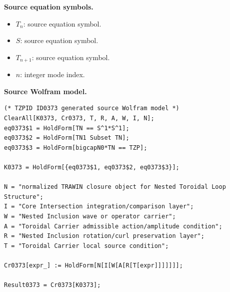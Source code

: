 \begin{minipage}[t]{0.49\linewidth}
\begingroup
\small
\raggedright
\textbf{Source equation symbols.}\par
\begin{itemize}[leftmargin=1.35em,itemsep=1pt,topsep=1pt,parsep=0pt]
    \item $T_n$: source equation symbol.
    \item $S$: source equation symbol.
    \item $T_{n+1}$: source equation symbol.
    \item $n$: integer mode index.
\end{itemize}
\endgroup
\end{minipage}\hfill
\begin{minipage}[t]{0.47\linewidth}
\begingroup
\scriptsize
\raggedright
\textbf{Source Wolfram model.}\par
\begin{Verbatim}[fontsize=\tiny,breaklines=true,breakanywhere=true]
(* TZPID ID0373 generated source Wolfram model *)
ClearAll[K0373, Cr0373, T, R, A, W, I, N];
eq0373$1 = HoldForm[TN == S^1*S^1];
eq0373$2 = HoldForm[TN1 Subset TN];
eq0373$3 = HoldForm[bigcapN0*TN == TZP];

K0373 = HoldForm[{eq0373$1, eq0373$2, eq0373$3}];

N = "normalized TRAWIN closure object for Nested Toroidal Loop Structure";
I = "Core Intersection integration/comparison layer";
W = "Nested Inclusion wave or operator carrier";
A = "Toroidal Carrier admissible action/amplitude condition";
R = "Nested Inclusion rotation/curl preservation layer";
T = "Toroidal Carrier local source condition";

Cr0373[expr_] := HoldForm[N[I[W[A[R[T[expr]]]]]]];

Result0373 = Cr0373[K0373];
\end{Verbatim}
\endgroup
\end{minipage}

